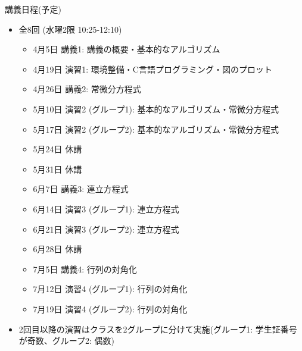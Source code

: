 \begin{frame}[t]{講義日程(予定)}
  \begin{itemize}
  \item 全8回 (水曜2限 10:25-12:10)
    \begin{itemize}
    \item 4月5日 講義1: 講義の概要・基本的なアルゴリズム
    \item 4月19日 演習1: 環境整備・C言語プログラミング・図のプロット
    \item 4月26日 講義2: 常微分方程式
    \item 5月10日 演習2 (グループ1): 基本的なアルゴリズム・常微分方程式
    \item 5月17日 演習2 (グループ2): 基本的なアルゴリズム・常微分方程式
    \item {\color{gray} 5月24日 休講}
    \item {\color{gray} 5月31日 休講}
    \item 6月7日 講義3: 連立方程式
    \item 6月14日 演習3 (グループ1): 連立方程式
    \item 6月21日 演習3 (グループ2): 連立方程式
    \item {\color{gray} 6月28日 休講}
    \item 7月5日 講義4: 行列の対角化
    \item 7月12日 演習4 (グループ1): 行列の対角化
    \item 7月19日 演習4 (グループ2): 行列の対角化
    \end{itemize}
  \item 2回目以降の演習はクラスを2グループに分けて実施(グループ1: 学生証番号が奇数、グループ2: 偶数)
  \end{itemize}
\end{frame}

